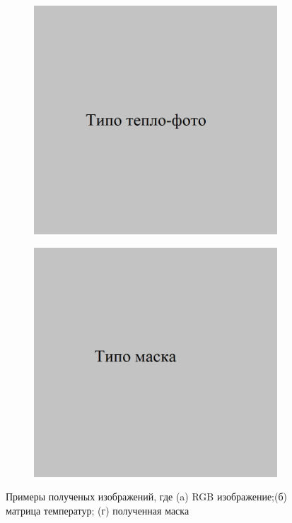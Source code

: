 \documentclass[t]{beamer}
\begin{document}
\begin{frame}
\begin{figure}[ht!]
\begin{subfigure}{.25\textwidth}
			\includegraphics[width = \textwidth]{image/tep_examp}
			\caption{}
		\end{subfigure}
		\begin{subfigure}{.25\textwidth}
			\centering
			\includegraphics[width = \textwidth]{image/mask}
			\caption{}
		\end{subfigure}
		\centering
		\caption{Примеры полученых изображений, где (a) RGB изображение;(б) матрица температур; (г) полученная маска}
		\label{fig:Examples}
	\end{figure}
	\end{frame}
\end{document}

